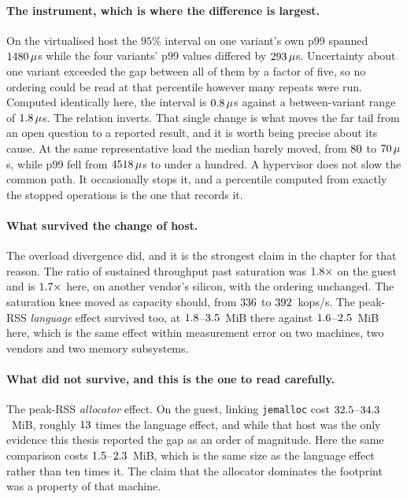 \documentclass[english,oneside,a4paper,censored,csm,software-track-2020]{HYthesisML}
\begin{document}
\paragraph{The instrument, which is where the difference is largest.}
On the virtualised host the $95\%$ interval on one variant's own p99 spanned
$1480\,\mu$s while the four variants' p99 values differed by
$293\,\mu$s. Uncertainty about one variant exceeded the gap between all of them by
a factor of five, so no ordering could be read at that percentile however many repeats were run.
Computed identically here, the interval is $0.8\,\mu$s against a between-variant range
of $1.8\,\mu$s. The relation inverts. That single change is what moves the far tail
from an open question to a reported result, and it is worth being precise about its cause. At the
same representative load the median barely moved, from $80$ to $70\,\mu$s,
while p99 fell from $4518\,\mu$s to under a hundred. A hypervisor does not slow the common
path. It
occasionally stops it, and a percentile computed from exactly the stopped operations is the one
that records it.

\paragraph{What survived the change of host.}
The overload divergence did, and it is the strongest claim in the chapter for that reason. The
ratio of sustained throughput past saturation was $1.8\times$ on the guest and
is $1.7\times$ here, on another vendor's silicon, with the ordering unchanged. The
saturation knee moved as capacity should, from $336$ to $392$~kops/s. The peak-RSS
\emph{language} effect survived too, at $1.8$--$3.5$~MiB there against
$1.6$--$2.5$~MiB here, which is the same effect within measurement error on
two machines, two vendors and two memory subsystems.

\paragraph{What did not survive, and this is the one to read carefully.}
The peak-RSS \emph{allocator} effect. On the guest, linking \texttt{jemalloc} cost
$32.5$--$34.3$~MiB, roughly $13$ times the language
effect, and while that host was the only evidence this thesis reported the gap as an order of
magnitude. Here the same comparison costs $1.5$--$2.3$~MiB, which is the
same size as the language effect rather than ten times it. The claim that the allocator dominates
the footprint was a property of that machine.
\end{document}
